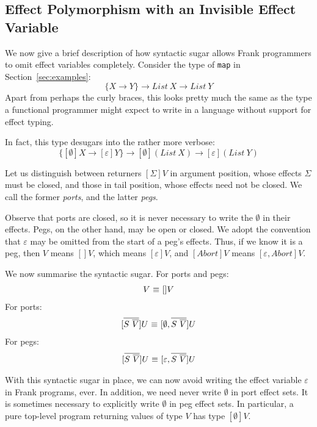 \documentclass[preprint]{sigplanconf}
\makeatletter
\newcommand{\many}{\overline}
\newcommand\ba{\begin{array}}
\newcommand\ea{\end{array}}
\newenvironment{equations}{\[\ba{@{}r@{~}c@{~}l@{}}}{\ea\]}
\newcommand{\sigs}{\Sigma}
\newcommand{\effbox}[1]{[#1]}
\newcommand{\var}{\mathit}
\newcommand{\thunk}[1]{\{{#1}\}}
\makeatother
\begin{document}
\subsection{Effect Polymorphism with an Invisible Effect Variable}

We now give a brief description of how syntactic sugar allows Frank
programmers to omit effect variables completely.
%
Consider the type of \verb!map! in Section~\ref{sec:examples}:
\[
\thunk{X \to Y} \to \var{List~X} \to \var{List~Y}
\]
Apart from perhaps the curly braces, this looks pretty much the same
as the type a functional programmer might expect to write in a
language without support for effect typing.

In fact, this type desugars into the rather more verbose:
\[
\thunk{\effbox{\emptyset}X \to \effbox{\varepsilon}Y}
  \to \effbox{\emptyset}(\var{List~X}) \to \effbox{\varepsilon}(\var{List~Y})
\]

Let us distinguish between returners $\effbox{\sigs}V$ in argument
position, whose effects $\sigs$ must be closed, and those in tail
position, whose effects need not be closed. We call the former
\emph{ports}, and the latter \emph{pegs}.

Observe that ports are closed, so it is never necessary to write the
$\emptyset$ in their effects. Pegs, on the other hand, may be open or
closed. We adopt the convention that $\varepsilon$ may be omitted from
the start of a peg's effects. Thus, if we know it is a peg, then $V$
means $\effbox{}V$, which means $\effbox{\varepsilon}V$, and
$\effbox{\var{Abort}}V$ means $\effbox{\varepsilon, \var{Abort}}V$.

We now summarise the syntactic sugar. For ports and pegs:
\begin{equations}
V &\equiv& \effbox{}V \\
\end{equations}
For ports:
\begin{equations}
\effbox{\many{S~\many{V}}}U &\equiv& \effbox{\emptyset, \many{S~\many{V}}}U \\
\end{equations}
For pegs:
\begin{equations}
\effbox{\many{S~\many{V}}}U &\equiv& \effbox{\varepsilon, \many{S~\many{V}}}U \\
\end{equations}

With this syntactic sugar in place, we can now avoid writing the
effect variable $\varepsilon$ in Frank programs, ever. In addition, we
need never write $\emptyset$ in port effect sets. It is sometimes
necessary to explicitly write $\emptyset$ in peg effect sets. In
particular, a pure top-level program returning values of type $V$ has
type $\effbox{\emptyset}V$.
\end{document}
